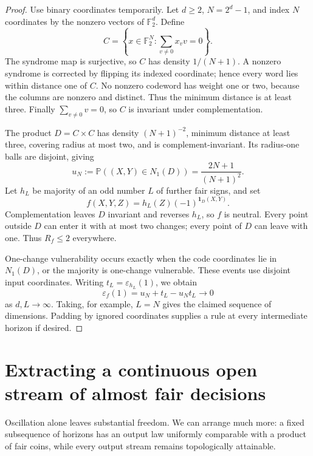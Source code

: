 \documentclass[11pt]{article}
\theoremstyle{definition}
\theoremstyle{remark}
\newcommand{\Prb}{\mathbb P}
\newcommand{\F}{\mathbb F}
\newcommand{\eps}{\varepsilon}
\newcommand{\one}{\mathbf 1}
\begin{document}
\begin{proof}
Use binary coordinates temporarily. Let \(d\ge2\), \(N=2^d-1\), and index
\(N\) coordinates by the nonzero vectors of \(\F_2^d\). Define
\[
 C=\left\{x\in\F_2^N:\sum_{v\ne0}x_vv=0\right\}.
\]
The syndrome map is surjective, so \(C\) has density \(1/(N+1)\). A
nonzero syndrome is corrected by flipping its indexed coordinate; hence every
word lies within distance one of \(C\). No nonzero codeword has weight one or
two, because the columns are nonzero and distinct. Thus the minimum distance
is at least three. Finally \(\sum_{v\ne0}v=0\), so \(C\) is invariant under
complementation.

The product \(D=C\times C\) has density \((N+1)^{-2}\), minimum distance
at least three, covering radius at most two, and is complement-invariant.
Its radius-one balls are disjoint, giving
\[
 u_N:=\Prb((X,Y)\in N_1(D))=\frac{2N+1}{(N+1)^2}.
\]
Let \(h_L\) be majority of an odd number \(L\) of further fair signs, and set
\[
 f(X,Y,Z)=h_L(Z)(-1)^{\one_D(X,Y)}.
\]
Complementation leaves \(D\) invariant and reverses \(h_L\), so \(f\) is
neutral. Every point outside \(D\) can enter it with at most two changes;
every point of \(D\) can leave with one. Thus \(R_f\le2\) everywhere.

One-change vulnerability occurs exactly when the code coordinates lie in
\(N_1(D)\), or the majority is one-change vulnerable. These events use
disjoint input coordinates. Writing \(t_L=\eps_{h_L}(1)\), we obtain
\begin{equation}
 \eps_f(1)=u_N+t_L-u_Nt_L\longrightarrow0
 \label{rch:eq:codeseparation}
\end{equation}
as \(d,L\to\infty\). Taking, for example, \(L=N\) gives the claimed
sequence of dimensions. Padding by ignored coordinates supplies a rule at
every intermediate horizon if desired.
\end{proof}

\section{Extracting a continuous open stream of almost fair decisions}
\label{rch:sec:extraction}

Oscillation alone leaves substantial freedom. We can arrange much more: a fixed
subsequence of horizons has an output law uniformly comparable with a product
of fair coins, while every output stream remains topologically attainable.
\end{document}
